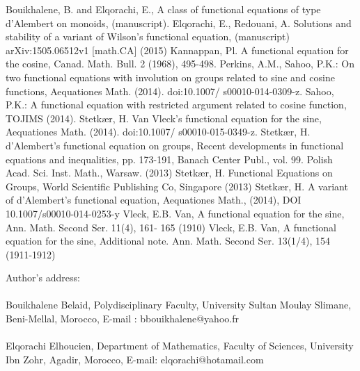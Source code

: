 \documentclass[12pt]{amsart}
\theoremstyle{definition}
\theoremstyle{remark}
\numberwithin{equation}{section}
\begin{document}
\begin{thebibliography}{20}
 Bouikhalene, B. and Elqorachi, E., A class of functional equations of type  d'Alembert on
monoids, (manuscript).
 Elqorachi, E., Redouani, A. Solutions and stability of a variant
of Wilson's functional equation, (manuscript) arXiv:1505.06512v1
[math.CA] (2015)
  Kannappan, Pl. A functional equation for the cosine, Canad. Math.
Bull. 2 (1968), 495-498.
 Perkins, A.M., Sahoo, P.K.: On two functional equations with
involution on groups related to sine and cosine functions,
Aequationes Math. (2014). doi:10.1007/ s00010-014-0309-z.
 Sahoo, P.K.: A functional equation with restricted argument related
to cosine function, TOJIMS (2014).
 Stetk\ae r, H. Van Vleck's functional equation for the
sine, Aequationes Math. (2014). doi:10.1007/ s00010-015-0349-z.
 Stetk\ae r, H. d'Alembert's functional equation on groups, Recent
developments in functional equations and inequalities, pp. 173-191,
Banach Center Publ., vol. 99. Polish Acad. Sci. Inst. Math., Warsaw.
(2013)  Stetk{\ae}r, H. Functional Equations on Groups,
World Scientific Publishing Co, Singapore (2013)
 Stetk\ae r, H. A variant of d'Alembert's
functional equation, Aequationes Math., (2014), DOI
10.1007/s00010-014-0253-y
 Vleck, E.B. Van, A
functional equation for the sine, Ann. Math. Second Ser. 11(4), 161-
165 (1910)
  Vleck, E.B. Van, A functional equation for the
sine, Additional note. Ann. Math. Second Ser. 13(1/4), 154
(1911-1912)
\end{thebibliography}
Author's address:\\\\  Bouikhalene Belaid, Polydisciplinary Faculty,
University Sultan Moulay Slimane, Beni-Mellal, Morocco, E-mail :
bbouikhalene@yahoo.fr\\ \\ Elqorachi Elhoucien, Department of
Mathematics, Faculty of Sciences, University Ibn Zohr, Agadir,
Morocco, E-mail: elqorachi@hotamail.com
\end{document}
